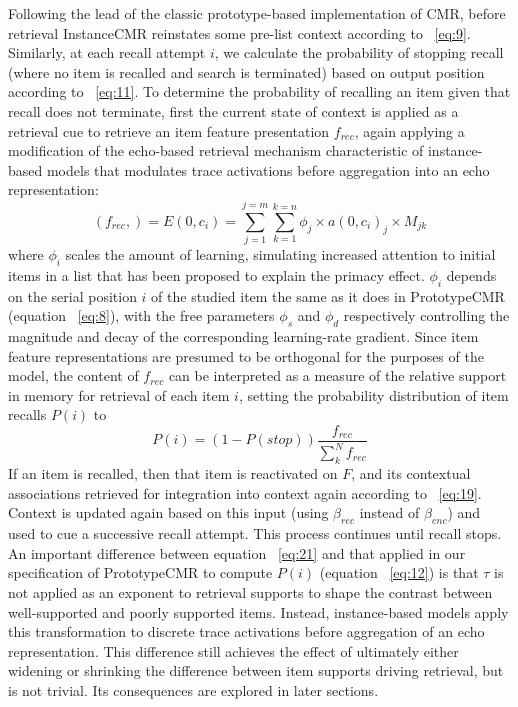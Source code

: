 {}\markdownRendererInterblockSeparator
{}Following the lead of the classic prototype-based implementation of CMR, before retrieval InstanceCMR reinstates some pre-list context according to ~\ref{eq:9}. Similarly, at each recall attempt $i$, we calculate the probability of stopping recall (where no item is recalled and search is terminated) based on output position according to ~\ref{eq:11}.\markdownRendererInterblockSeparator
{}To determine the probability of recalling an item given that recall does not terminate, first the current state of context is applied as a retrieval cue to retrieve an item feature presentation $f_{rec}$, again applying a modification of the echo-based retrieval mechanism characteristic of instance-based models that modulates trace activations before aggregation into an echo representation:\markdownRendererInterblockSeparator
{}\begin{equation} \label{eq:20} (f_{rec},) = E(0, c_i) = \sum^{j=m}_{j=1}\sum^{k=n}_{k=1} {\phi}_j \times a(0, c_i)_j \times M_{jk} \end{equation}\markdownRendererInterblockSeparator
{}where ${\phi}_i$ scales the amount of learning, simulating increased attention to initial items in a list that has been proposed to explain the primacy effect. ${\phi}_i$ depends on the serial position $i$ of the studied item the same as it does in PrototypeCMR (equation ~\ref{eq:8}), with the free parameters ${\phi}_s$ and ${\phi}_d$ respectively controlling the magnitude and decay of the corresponding learning-rate gradient.\markdownRendererInterblockSeparator
{}Since item feature representations are presumed to be orthogonal for the purposes of the model, the content of $f_{rec}$ can be interpreted as a measure of the relative support in memory for retrieval of each item $i$, setting the probability distribution of item recalls $P(i)$ to \markdownRendererInterblockSeparator
{}\begin{equation} \label{eq:21} P(i) = (1-P(stop))\frac{f_{rec}}{\sum_{k}^{N}f_{rec}} \end{equation}\markdownRendererInterblockSeparator
{}If an item is recalled, then that item is reactivated on $F$, and its contextual associations retrieved for integration into context again according to ~\ref{eq:19}. Context is updated again based on this input (using $\beta_{rec}$ instead of $\beta_{enc}$) and used to cue a successive recall attempt. This process continues until recall stops.\markdownRendererInterblockSeparator
{}An important difference between equation ~\ref{eq:21} and that applied in our specification of PrototypeCMR to compute $P(i)$ (equation ~\ref{eq:12}) is that $\tau$ is not applied as an exponent to retrieval supports to shape the contrast between well-supported and poorly supported items. Instead, instance-based models apply this transformation to discrete trace activations before aggregation of an echo representation. This difference still achieves the effect of ultimately either widening or shrinking the difference between item supports driving retrieval, but is not trivial. Its consequences are explored in later sections. \relax